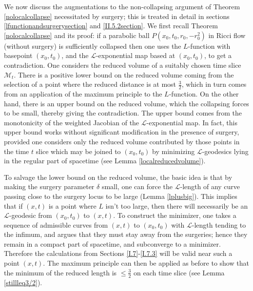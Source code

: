 \documentclass[12pt]{amsart}
\renewcommand{\L}{{\mathcal L}}
\newcommand{\M}{{\mathcal M}}
\newcommand{\de}{\delta}
\numberwithin{equation}{section}
\theoremstyle{plain}
\theoremstyle{definition}
\theoremstyle{remark}
\begin{document}
We now discuss the augmentations to the non-collapsing argument
of Theorem \ref{nolocalcollapse} necessitated by surgery; this is treated in detail in sections 
\ref{lfunctionandsurgerysection} and \ref{II.5.2section}.
We first recall Theorem \ref{nolocalcollapse} and its proof:
  if a parabolic ball $P(x_0,t_0,r_0,-r_0^2)$ 
in Ricci flow (without surgery) is
sufficiently collapsed then one
uses the $L$-function
with basepoint $(x_0,t_0)$, and the $\L$-exponential map based
at $(x_0,t_0)$, to get a contradiction.   One considers the reduced
volume of a suitably chosen time slice $\M_t$. There is a 
positive lower bound on the reduced volume coming
from the selection of a point where the reduced distance
is at most $\frac{3}{2}$, which in turn comes from an application of the 
maximum principle to the $L$-function. On the other hand, there
is an upper bound on the reduced volume, which the collapsing
forces to be small, thereby giving the contradiction. The upper bound comes
from the monotonicity of the weighted Jacobian of the $\L$-exponential
map.   In fact,  this upper bound works without
significant modification  in the presence of surgery,
provided one considers only the reduced volume contributed
by those points in the time $t$ slice
which may be joined to $(x_0,t_0)$ by minimizing $\L$-geodesics
lying in the regular part of spacetime (see Lemma \ref{localreducedvolume}).

To salvage the lower bound on the reduced volume, the basic idea is that
by making the surgery parameter $\de$ small, one can force the 
$\L$-length of any curve passing close to the surgery locus to 
be large (Lemma \ref{lplusbig}).   This implies that if $(x,t)$ is a point where $L$
isn't too large, then there will  necessarily be an
$\L$-geodesic from $(x_0,t_0)$ to $(x,t)$.  To construct
the minimizer, one takes  a sequence of admissible curves 
from $(x,t)$ to $(x_0,t_0)$ with
$\L$-length tending to the infimum, and argues that they must stay away from the 
surgeries; hence
they remain in a compact part of 
spacetime, and subconverge to a minimizer. 
Therefore the calculations
from Sections \ref{I.7}-\ref{I.7.3}
will be valid near such a point $(x,t)$. The 
maximum principle can then be applied as before 
to show that the minimum of the reduced
length is $\leq \frac{3}{2}$ on each time slice (see Lemma \ref{stillleq3/2}).  
\end{document}
